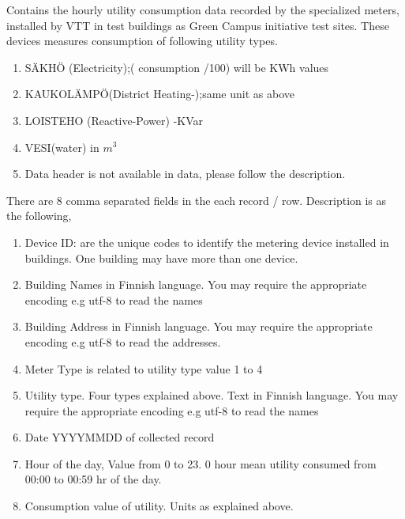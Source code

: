 Contains the hourly utility consumption data recorded by the specialized meters, installed by VTT in test buildings as Green Campus initiative test sites. These devices measures consumption of following utility types.
\begin{enumerate}

\item S{\"A}KH{\"O} (Electricity);( consumption /100) will be KWh values
\item KAUKOL{\"A}MP{\"O}(District Heating-);same unit as above
\item LOISTEHO (Reactive-Power) -KVar
\item VESI(water) in \(m^3\)
\item Data header is not available in data, please follow the description.
\end{enumerate}
There are 8 comma separated fields in the each record / row. Description is as the following, 
\begin{enumerate}
\item Device ID: are the unique codes to identify the metering device installed in buildings. One building may have more than one device.
\item Building Names in Finnish language. You may require the appropriate encoding e.g utf-8 to read the names
\item Building Address in Finnish language. You may require the appropriate encoding e.g utf-8 to read the addresses.
\item Meter Type is related to utility type value 1 to 4
\item Utility type. Four types explained above. Text in Finnish language. You may require the appropriate encoding e.g utf-8 to read the names
\item Date YYYYMMDD of collected record
\item Hour of the day, Value from 0 to 23. 0 hour mean utility consumed from 00:00 to 00:59 hr of the day.
\item Consumption value of utility. Units as explained above.
\end{enumerate}

